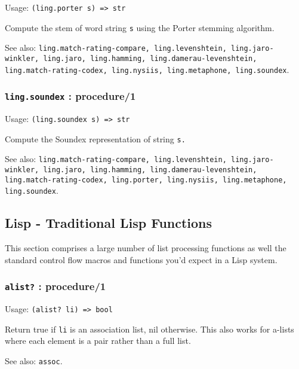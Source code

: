 \documentclass[
]{article}
\newcommand{\passthrough}[1]{#1}
\begin{document}
Usage: \passthrough{\lstinline!(ling.porter s) => str!}

Compute the stem of word string \passthrough{\lstinline!s!} using the
Porter stemming algorithm.

See also:
\passthrough{\lstinline!ling.match-rating-compare, ling.levenshtein, ling.jaro-winkler, ling.jaro, ling.hamming, ling.damerau-levenshtein, ling.match-rating-codex, ling.nysiis, ling.metaphone, ling.soundex!}.

\hypertarget{ling.soundex-procedure1}{%
\subsubsection{\texorpdfstring{\texttt{ling.soundex} :
procedure/1}{ling.soundex : procedure/1}}\label{ling.soundex-procedure1}}

Usage: \passthrough{\lstinline!(ling.soundex s) => str!}

Compute the Soundex representation of string
\passthrough{\lstinline!s.!}

See also:
\passthrough{\lstinline!ling.match-rating-compare, ling.levenshtein, ling.jaro-winkler, ling.jaro, ling.hamming, ling.damerau-levenshtein, ling.match-rating-codex, ling.porter, ling.nysiis, ling.metaphone, ling.soundex!}.

\hypertarget{lisp---traditional-lisp-functions}{%
\subsection{Lisp - Traditional Lisp
Functions}\label{lisp---traditional-lisp-functions}}

This section comprises a large number of list processing functions as
well the standard control flow macros and functions you'd expect in a
Lisp system.

\hypertarget{alist-procedure1}{%
\subsubsection{\texorpdfstring{\texttt{alist?} :
procedure/1}{alist? : procedure/1}}\label{alist-procedure1}}

Usage: \passthrough{\lstinline!(alist? li) => bool!}

Return true if \passthrough{\lstinline!li!} is an association list, nil
otherwise. This also works for a-lists where each element is a pair
rather than a full list.

See also: \passthrough{\lstinline!assoc!}.
\end{document}
